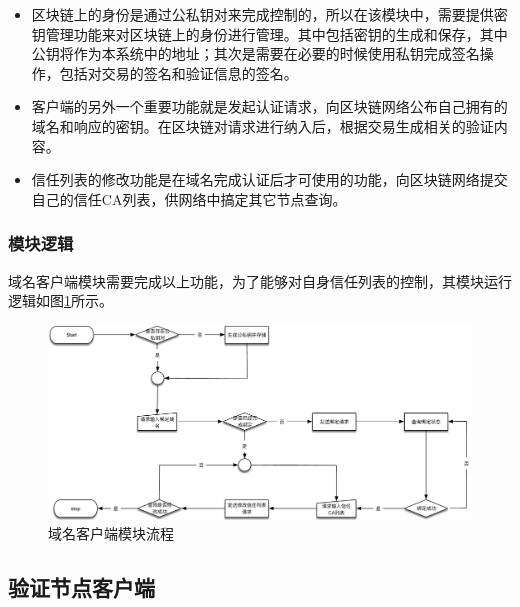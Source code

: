 \begin{itemize}
	\item 
	\noindent{}

	区块链上的身份是通过公私钥对来完成控制的，所以在该模块中，需要提供密钥管理功能来对区块链上的身份进行管理。其中包括密钥的生成和保存，其中公钥将作为本系统中的地址；其次是需要在必要的时候使用私钥完成签名操作，包括对交易的签名和验证信息的签名。

	\item 
	\noindent{}

	客户端的另外一个重要功能就是发起认证请求，向区块链网络公布自己拥有的域名和响应的密钥。在区块链对请求进行纳入后，根据交易生成相关的验证内容。

	\item
	\noindent{}

	信任列表的修改功能是在域名完成认证后才可使用的功能，向区块链网络提交自己的信任CA列表，供网络中搞定其它节点查询。

\end{itemize}

\subsubsection{模块逻辑}

域名客户端模块需要完成以上功能，为了能够对自身信任列表的控制，其模块运行逻辑如图\ref{fig:domaincli_work_flow}所示。

\begin{figure}[!htbp]
 	\centering
 	\includegraphics[width=1\textwidth]{img/domaincli_work_flow}
 	\caption{域名客户端模块流程}\label{fig:domaincli_work_flow}
\end{figure}




\subsection{验证节点客户端}

